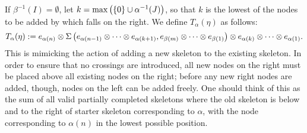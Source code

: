 If $\beta^{-1}(I) = \emptyset$, let $k = \max\left(\left\{0\right\}\cup \alpha^{-1}(J)\right)$, so that $k$ is the lowest of the nodes to be added by which falls on the right.
We define $T_\alpha(\eta)$ as follows:
\[
	T_\alpha(\eta) := e_{\alpha(n)} \otimes \Sigma\left( e_{\alpha(n - 1)} \otimes \cdots \otimes e_{\alpha(k+1)}, e_{\beta(m)} \otimes \cdots \otimes e_{\beta(1)} \right) \otimes e_{\alpha(k)} \otimes \cdots \otimes e_{\alpha(1)}.
\]
This is mimicking the action of adding a new skeleton to the existing skeleton.
In order to ensure that no crossings are introduced, all new nodes on the right must be placed above all existing nodes on the right; before any new right nodes are added, though, nodes on the left can be added freely.
One should think of this as the sum of all valid partially completed skeletons where the old skeleton is below and to the right of starter skeleton corresponding to $\alpha$, with the node corresponding to $\alpha(n)$ in the lowest possible position.

